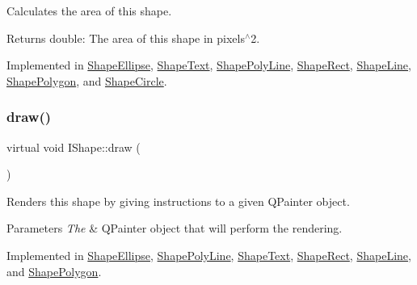 Calculates the area of this shape. 

\begin{DoxyReturn}{Returns}
double\+: The area of this shape in pixels$^\wedge$2. 
\end{DoxyReturn}


Implemented in \mbox{\hyperlink{class_shape_ellipse_a08287b301b7501eb941805eaf85fc00c}{Shape\+Ellipse}}, \mbox{\hyperlink{class_shape_text_a0aad29654b21ec4dc1990df2c236b2da}{Shape\+Text}}, \mbox{\hyperlink{class_shape_poly_line_ace9d3c1eefec00364034dc420262c91e}{Shape\+Poly\+Line}}, \mbox{\hyperlink{class_shape_rect_a87e891eaa6975fc73f4148427076812e}{Shape\+Rect}}, \mbox{\hyperlink{class_shape_line_a6f33bdd78706ad73e570b4ba53bbc00b}{Shape\+Line}}, \mbox{\hyperlink{class_shape_polygon_a60c6cad5af503e0c405523a06e9471eb}{Shape\+Polygon}}, and \mbox{\hyperlink{class_shape_circle_aebc30fb4ad7165778deb75f0bd2d69bd}{Shape\+Circle}}.

\mbox{\label{class_i_shape_ad97c626e7e2c9afb9f51efc41b836e6f}} 
\subsubsection{\texorpdfstring{draw()}{draw()}}
{\footnotesize\ttfamily virtual void I\+Shape\+::draw (\begin{DoxyParamCaption}\item[{Q\+Painter \&}]{ }\end{DoxyParamCaption})\hspace{0.3cm}{\ttfamily [pure virtual]}}



Renders this shape by giving instructions to a given Q\+Painter object. 


\begin{DoxyParams}{Parameters}
{\em The} & Q\+Painter object that will perform the rendering. \\
\hline
\end{DoxyParams}


Implemented in \mbox{\hyperlink{class_shape_ellipse_ac7f0a33cb5a88c6956f2d876c0c5d313}{Shape\+Ellipse}}, \mbox{\hyperlink{class_shape_poly_line_a6aaca4bd2767644f9ea0f68065fa1f98}{Shape\+Poly\+Line}}, \mbox{\hyperlink{class_shape_text_a554bed75c86d0ca7d555eefbc7aff7dc}{Shape\+Text}}, \mbox{\hyperlink{class_shape_rect_acc35ed70d85acd941b56cc505b9fae6c}{Shape\+Rect}}, \mbox{\hyperlink{class_shape_line_a8b4dbfe05387934a0f9c4a053a798239}{Shape\+Line}}, and \mbox{\hyperlink{class_shape_polygon_a6f4ed4749a739aaf44b5680d75ae8538}{Shape\+Polygon}}.

